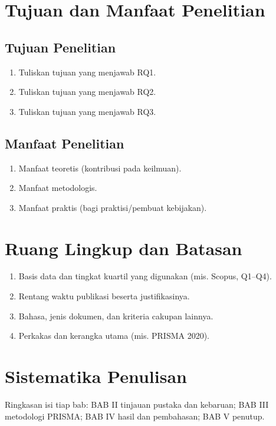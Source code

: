 \documentclass[12pt,a4paper,oneside]{report}
\begin{document}
\section{Tujuan dan Manfaat Penelitian}
\subsection{Tujuan Penelitian}
\begin{enumerate}[label=\arabic*., leftmargin=*, itemsep=2pt]
  \item Tuliskan tujuan yang menjawab RQ1.
  \item Tuliskan tujuan yang menjawab RQ2.
  \item Tuliskan tujuan yang menjawab RQ3.
\end{enumerate}

\subsection{Manfaat Penelitian}
\begin{enumerate}[label=\arabic*., leftmargin=*, itemsep=2pt]
  \item Manfaat teoretis (kontribusi pada keilmuan).
  \item Manfaat metodologis.
  \item Manfaat praktis (bagi praktisi/pembuat kebijakan).
\end{enumerate}

\section{Ruang Lingkup dan Batasan}
\begin{enumerate}[label=\arabic*., leftmargin=*, itemsep=2pt]
  \item Basis data dan tingkat kuartil yang digunakan (mis. Scopus, Q1--Q4).
  \item Rentang waktu publikasi beserta justifikasinya.
  \item Bahasa, jenis dokumen, dan kriteria cakupan lainnya.
  \item Perkakas dan kerangka utama (mis. PRISMA 2020).
\end{enumerate}

\section{Sistematika Penulisan}
Ringkasan isi tiap bab: BAB II tinjauan pustaka dan kebaruan; BAB III metodologi
PRISMA; BAB IV hasil dan pembahasan; BAB V penutup.
\end{document}
